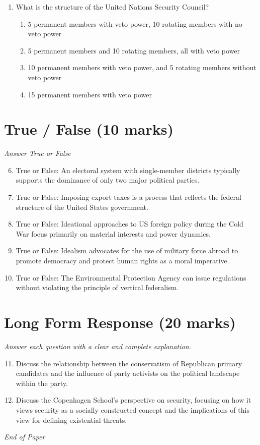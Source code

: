 \documentclass[12pt]{article}
\begin{document}
\begin{enumerate}[label=\arabic*.]
\begin{enumerate}[label=(\alph*)]
    \item Jimmy Carter
    \item Ronald Reagan
    \item Bill Clinton
    \item Dwight Eisenhower
\end{enumerate}
\item What is the structure of the United Nations Security Council?
\begin{enumerate}[label=(\alph*)]
    \item 5 permanent members with veto power, 10 rotating members with no veto power
    \item 5 permanent members and 10 rotating members, all with veto power
    \item 10 permanent members with veto power, and 5 rotating members without veto power
    \item 15 permanent members with veto power
\end{enumerate}
\end{enumerate}

\section*{True / False (10 marks)}
\textit{Answer True or False}
\begin{enumerate}[label=\arabic*.]
\setcounter{enumi}{5}
\item True or False: An electoral system with single-member districts typically supports the dominance of only two major political parties.
\item True or False: Imposing export taxes is a process that reflects the federal structure of the United States government.
\item True or False: Ideational approaches to US foreign policy during the Cold War focus primarily on material interests and power dynamics.
\item True or False: Idealism advocates for the use of military force abroad to promote democracy and protect human rights as a moral imperative.
\item True or False: The Environmental Protection Agency can issue regulations without violating the principle of vertical federalism.
\end{enumerate}

\section*{Long Form Response (20 marks)}
\textit{Answer each question with a clear and complete explanation.}
\begin{enumerate}[label=\arabic*.]
\setcounter{enumi}{10}
\item Discuss the relationship between the conservatism of Republican primary candidates and the influence of party activists on the political landscape within the party.
\item Discuss the Copenhagen School's perspective on security, focusing on how it views security as a socially constructed concept and the implications of this view for defining existential threats.
\end{enumerate}

\vfill
\noindent\textit{End of Paper}
\end{document}
